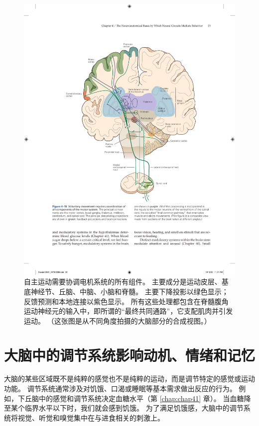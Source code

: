 \begin{figure}[htbp]
	\centering
	\includegraphics[width=1.0\linewidth]{chap04/fig_4_15}
	\caption{自主运动需要协调电机系统的所有组件。 
		主要成分是运动皮层、基底神经节、丘脑、中脑、小脑和脊髓。 
		主要下降投影以绿色显示； 反馈预测和本地连接以紫色显示。 
		所有这些处理都包含在脊髓腹角运动神经元的输入中，即所谓的“最终共同通路”，它支配肌肉并引发运动。 
		（这张图是从不同角度拍摄的大脑部分的合成视图。）}
	\label{fig:4_15}
\end{figure}


\section{大脑中的调节系统影响动机、情绪和记忆}
大脑的某些区域既不是纯粹的感觉也不是纯粹的运动，而是调节特定的感觉或运动功能。 
调节系统通常涉及对饥饿、口渴或睡眠等基本需求做出反应的行为。 
例如，下丘脑中的感觉和调节系统决定血糖水平（第 \ref{chap:chap41} 章）。 
当血糖降至某个临界水平以下时，我们就会感到饥饿。 
为了满足饥饿感，大脑中的调节系统将视觉、听觉和嗅觉集中在与进食相关的刺激上。


